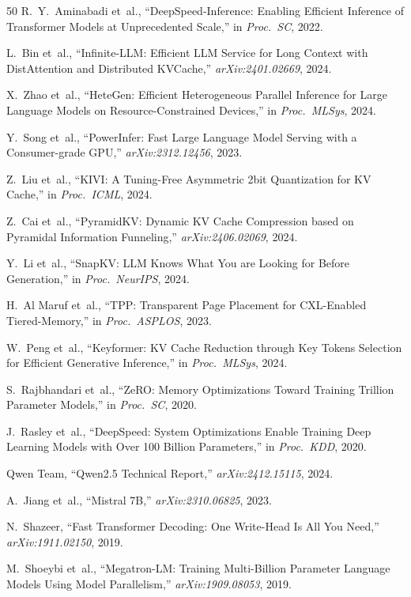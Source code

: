 \documentclass[conference]{IEEEtran}
\begin{document}
\begin{thebibliography}{50}
 R.~Y.~Aminabadi et~al., ``DeepSpeed-Inference: Enabling Efficient Inference of Transformer Models at Unprecedented Scale,'' in \textit{Proc.\ SC}, 2022.

 L.~Bin et~al., ``Infinite-LLM: Efficient LLM Service for Long Context with DistAttention and Distributed KVCache,'' \textit{arXiv:2401.02669}, 2024.

 X.~Zhao et~al., ``HeteGen: Efficient Heterogeneous Parallel Inference for Large Language Models on Resource-Constrained Devices,'' in \textit{Proc.\ MLSys}, 2024.

 Y.~Song et~al., ``PowerInfer: Fast Large Language Model Serving with a Consumer-grade GPU,'' \textit{arXiv:2312.12456}, 2023.

 Z.~Liu et~al., ``KIVI: A Tuning-Free Asymmetric 2bit Quantization for KV Cache,'' in \textit{Proc.\ ICML}, 2024.

 Z.~Cai et~al., ``PyramidKV: Dynamic KV Cache Compression based on Pyramidal Information Funneling,'' \textit{arXiv:2406.02069}, 2024.

 Y.~Li et~al., ``SnapKV: LLM Knows What You are Looking for Before Generation,'' in \textit{Proc.\ NeurIPS}, 2024.

 H.~Al Maruf et~al., ``TPP: Transparent Page Placement for CXL-Enabled Tiered-Memory,'' in \textit{Proc.\ ASPLOS}, 2023.

 W.~Peng et~al., ``Keyformer: KV Cache Reduction through Key Tokens Selection for Efficient Generative Inference,'' in \textit{Proc.\ MLSys}, 2024.

 S.~Rajbhandari et~al., ``ZeRO: Memory Optimizations Toward Training Trillion Parameter Models,'' in \textit{Proc.\ SC}, 2020.

 J.~Rasley et~al., ``DeepSpeed: System Optimizations Enable Training Deep Learning Models with Over 100 Billion Parameters,'' in \textit{Proc.\ KDD}, 2020.

 Qwen Team, ``Qwen2.5 Technical Report,'' \textit{arXiv:2412.15115}, 2024.

 A.~Jiang et~al., ``Mistral 7B,'' \textit{arXiv:2310.06825}, 2023.

 N.~Shazeer, ``Fast Transformer Decoding: One Write-Head Is All You Need,'' \textit{arXiv:1911.02150}, 2019.

 M.~Shoeybi et~al., ``Megatron-LM: Training Multi-Billion Parameter Language Models Using Model Parallelism,'' \textit{arXiv:1909.08053}, 2019.


\end{thebibliography}
\end{document}
